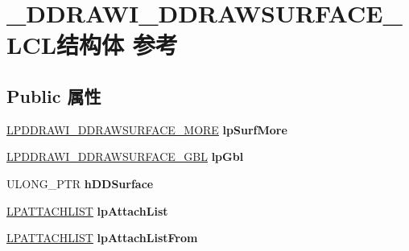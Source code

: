 \hypertarget{struct___d_d_r_a_w_i___d_d_r_a_w_s_u_r_f_a_c_e___l_c_l}{}\section{\+\_\+\+D\+D\+R\+A\+W\+I\+\_\+\+D\+D\+R\+A\+W\+S\+U\+R\+F\+A\+C\+E\+\_\+\+L\+C\+L结构体 参考}
\label{struct___d_d_r_a_w_i___d_d_r_a_w_s_u_r_f_a_c_e___l_c_l}
\subsection*{Public 属性}
\begin{DoxyCompactItemize}
\item 
\mbox{\label{struct___d_d_r_a_w_i___d_d_r_a_w_s_u_r_f_a_c_e___l_c_l_abd75705aa80029b3493ed00ff84f482f}} 
\hyperlink{struct___d_d_r_a_w_i___d_d_r_a_w_s_u_r_f_a_c_e___m_o_r_e}{L\+P\+D\+D\+R\+A\+W\+I\+\_\+\+D\+D\+R\+A\+W\+S\+U\+R\+F\+A\+C\+E\+\_\+\+M\+O\+RE} {\bfseries lp\+Surf\+More}
\item 
\mbox{\label{struct___d_d_r_a_w_i___d_d_r_a_w_s_u_r_f_a_c_e___l_c_l_a9b8fd2339d0a10d1a045214c4385c932}} 
\hyperlink{struct___d_d_r_a_w_i___d_d_r_a_w_s_u_r_f_a_c_e___g_b_l}{L\+P\+D\+D\+R\+A\+W\+I\+\_\+\+D\+D\+R\+A\+W\+S\+U\+R\+F\+A\+C\+E\+\_\+\+G\+BL} {\bfseries lp\+Gbl}
\item 
\mbox{\label{struct___d_d_r_a_w_i___d_d_r_a_w_s_u_r_f_a_c_e___l_c_l_aa35bf6af6795e259a9c502777e1ebdba}} 
U\+L\+O\+N\+G\+\_\+\+P\+TR {\bfseries h\+D\+D\+Surface}
\item 
\mbox{\label{struct___d_d_r_a_w_i___d_d_r_a_w_s_u_r_f_a_c_e___l_c_l_a56a2ef5153daf066f1a40abccafe09be}} 
\hyperlink{struct___a_t_t_a_c_h_l_i_s_t}{L\+P\+A\+T\+T\+A\+C\+H\+L\+I\+ST} {\bfseries lp\+Attach\+List}
\item 
\mbox{\label{struct___d_d_r_a_w_i___d_d_r_a_w_s_u_r_f_a_c_e___l_c_l_a66f4aa264185217437e2313967677bbb}} 
\hyperlink{struct___a_t_t_a_c_h_l_i_s_t}{L\+P\+A\+T\+T\+A\+C\+H\+L\+I\+ST} {\bfseries lp\+Attach\+List\+From}

\end{DoxyCompactItemize}
